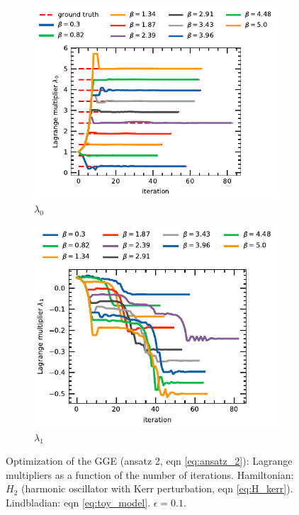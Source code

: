 \begin{figure}[t]
     \centering
     \begin{subfigure}[c]{0.45\textwidth}
         \centering
         \includegraphics[scale=0.9]{figs/opti_case_4_lagr_0.pdf}
         \caption{$\lambda_0$}
         \label{fig:opti_case_4_0}
     \end{subfigure}
     \hfill
     \begin{subfigure}[c]{0.45\textwidth}
         \centering
         \includegraphics[scale=0.9]{figs/opti_case_4_lagr_1.pdf}
         \caption{$\lambda_1$}
         \label{fig:opti_case_4_1}
     \end{subfigure}
        \caption{Optimization of the GGE (ansatz 2, eqn \ref{eq:ansatz_2}): Lagrange multipliers as a function of the number of iterations. Hamiltonian: $H_2$ (harmonic oscillator with Kerr perturbation, eqn \ref{eq:H_kerr}). Lindbladian: eqn \ref{eq:toy_model}. $\epsilon = 0.1$.}
        \label{fig:opti_case_4_all}
\end{figure}

